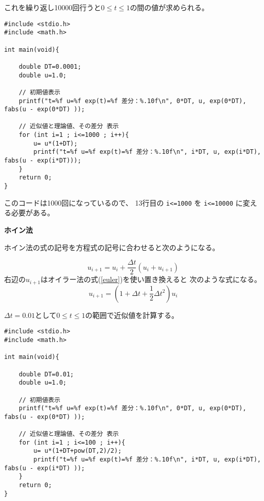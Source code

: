 \documentclass[12pt,b5paper]{ltjsarticle}
\begin{document}
これを繰り返し10000回行うと$0\leq t \leq 1$の間の値が求められる。

\begin{lstlisting}
#include <stdio.h>
#include <math.h>

int main(void){

    double DT=0.0001;
    double u=1.0;

    // 初期値表示
    printf("t=%f u=%f exp(t)=%f 差分：%.10f\n", 0*DT, u, exp(0*DT), fabs(u - exp(0*DT) ));

    // 近似値と理論値、その差分 表示
    for (int i=1 ; i<=1000 ; i++){
        u= u*(1+DT);
        printf("t=%f u=%f exp(t)=%f 差分：%.10f\n", i*DT, u, exp(i*DT), fabs(u - exp(i*DT)));
    }
    return 0;
}
\end{lstlisting}

このコードは1000回になっているので、
13行目の \texttt{i<=1000} を
\texttt{i<=10000} に変える必要がある。




\dotfill
\textbf{ホイン法}
\dotfill


ホイン法の式の記号を方程式の記号に合わせると次のようになる。

\begin{equation}
 u_{i+1}
 = u_{i} + \frac{\Delta t}{2}\left(  u_{i} +  u_{i+1} \right)
\end{equation}
右辺の$u_{i+1}$はオイラー法の式(\ref{euler})を使い置き換えると
次のような式になる。
\begin{equation}
 u_{i+1}
  =
  \left( 1+\Delta t + \frac{1}{2}\Delta t^2 \right) u_{i}
\end{equation}

$\Delta t = 0.01$として$0\leq t \leq 1$の範囲で近似値を計算する。



\begin{lstlisting}
#include <stdio.h>
#include <math.h>

int main(void){

    double DT=0.01;
    double u=1.0;

    // 初期値表示
    printf("t=%f u=%f exp(t)=%f 差分：%.10f\n", 0*DT, u, exp(0*DT), fabs(u - exp(0*DT) ));

    // 近似値と理論値、その差分 表示
    for (int i=1 ; i<=100 ; i++){
        u= u*(1+DT+pow(DT,2)/2);
        printf("t=%f u=%f exp(t)=%f 差分：%.10f\n", i*DT, u, exp(i*DT), fabs(u - exp(i*DT) ));
    }
    return 0;
}
\end{lstlisting}
\end{document}
